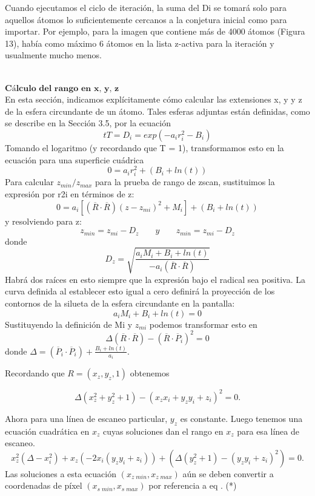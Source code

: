 Cuando ejecutamos el ciclo de iteración, la suma del Di se tomará solo para aquellos átomos lo suficientemente cercanos a la conjetura inicial como para importar. Por ejemplo, para la imagen que contiene más de 4000 átomos (Figura 13), había como máximo 6 átomos en la lista z-activa para la iteración y usualmente mucho menos.


${ }$\\
$\textbf{Cálculo del rango en x, y, z}$
${ }$\\

En esta sección, indicamos explícitamente cómo calcular las extensiones x, y y z de la esfera circundante de un átomo. Tales esferas adjuntas están definidas, como se describe en la Sección 3.5, por la ecuación
\[
	tT = D_i = exp (-a_i r^{2}_{i} - B_i)
\]
Tomando el logaritmo (y recordando que T = 1), transformamos esto en la ecuación para una superficie cuádrica
\[
	0 = a_i r^{2}_{i} + (B_i + ln(t))
\]
Para calcular $z_ {min} / z_ {max}$ para la prueba de rango de zscan, sustituimos la expresión por r2i en términos de z:
\[
	0 = a_i [(\overline{R} \cdot \overline{R})(z-z_{mi})^2 + M_i] + (B_i + ln(t))
\]
y resolviendo para z:
\[
	z_{min} = z_{mi} - D_z \;\;\;\;\;\;\; y \;\;\;\;\;\;\; z_{min} = z_{mi} - D_z
\]
donde
\[
	D_z = \sqrt{\frac{a_i M_i + B_i + ln(t)}{-a_i(\overline{R} \cdot \overline{R})}}
\]
Habrá dos raíces en esto siempre que la expresión bajo el radical sea positiva. La curva definida al establecer esto igual a cero definirá la proyección de los contornos de la silueta de la esfera circundante en la pantalla:
\[
	a_i M_i + B_i + ln(t) = 0
\]
Sustituyendo la definición de Mi y $z_ {mi}$ podemos transformar esto en
\[
	\Delta (\overline{R} \cdot \overline{R}) - (\overline{R} \cdot \overline{P}_i)^2 = 0
\]
donde $\Delta = (\overline{P}_i \cdot \overline{P}_i) + \frac{B_i + ln(t)}{a_i}$.

Recordando que $R = (x_z, y_z, 1)$ obtenemos

\[
	\Delta (x^{2}_{z} + y^{2}_{z} + 1) - (x_z x_i + y_z y_i + z_i)^2 = 0.
\]

Ahora para una línea de escaneo particular, $y_z$ es constante. Luego tenemos una ecuación cuadrática en $x_z$ cuyas soluciones dan el rango en $x_z$ para esa línea de escaneo.
\[
	x^{2}_{z} (\Delta - x^{2}_{i}) + x_z (-2 x_i (y_z y_i + z_i)) + (\Delta (y^{2}_{z} + 1) - (y_z y_i + z_i)^2) = 0.
\]
Las soluciones a esta ecuación $(x_ {z \; min}, x_ {z \; max})$ aún se deben convertir a coordenadas de píxel $(x_ {s \; min}, x_ {s \; max})$ por referencia a eq . (*)

